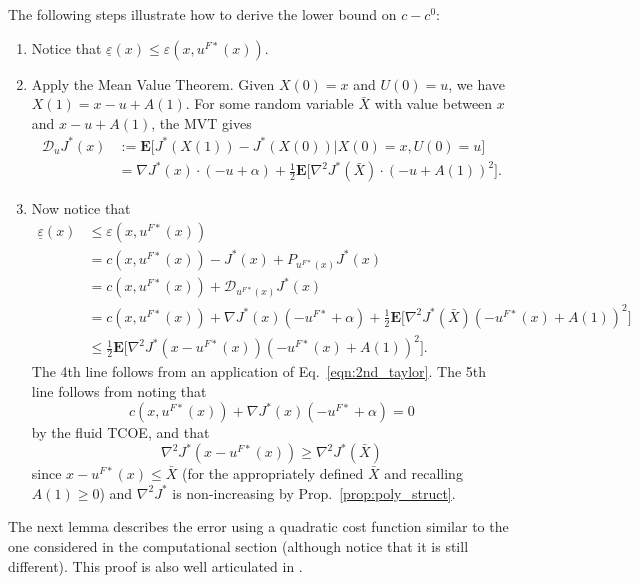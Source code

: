 \documentclass[11pt]{article}
\begin{document}
The following steps illustrate how to derive the lower bound on $c-c^0$:
\begin{enumerate}
\item Notice that $\underline \varepsilon(x) \leq \varepsilon(x,u^{F*}(x))$.
\item Apply the Mean Value Theorem. Given $X(0)=x$ and $U(0)=u$, we have $X(1)=x-u+A(1)$. For some random variable $\bar X$ with value between $x$ and $x-u+A(1)$, the MVT gives
\begin{equation}\label{eqn:2nd_taylor}
\begin{aligned}
\mathcal{D}_u J^*(x) &:= \mathbf{E} \Big[ J^*(X(1)) - J^*(X(0)) \vert X(0)=x, U(0)=u\Big] \\
	&= \nabla J^*(x) \cdot (-u + \alpha) + \frac{1}{2} \mathbf{E}\Big[ \nabla^2 J^*(\bar X) \cdot (-u + A(1))^2\Big].
\end{aligned}
\end{equation}

\item Now notice that
$$\begin{aligned}
\underline \varepsilon(x) &\leq \varepsilon(x, u^{F*}(x)) \\
	&= c\left(x,u^{F*}(x)\right) - J^*(x) + P_{u^{F*}(x)} J^*(x) \\
	&= c\left(x,u^{F*}(x)\right) + \mathcal{D}_{u^{F*}(x)}J^*(x) \\
	&= c\left(x,u^{F*}(x)\right) + \nabla J^*(x) \left(-u^{F*} +\alpha\right) + \frac{1}{2} \mathbf{E}\Big[ \nabla^2 J^*(\bar X)\left(-u^{F*}(x) + A(1)\right)^2\Big] \\
	&\leq \frac{1}{2} \mathbf{E}\Big[ \nabla^2 J^*\left(x-u^{F*}(x)\right)\left(-u^{F*}(x) + A(1)\right)^2\Big].
\end{aligned}$$
The 4th line follows from an application of Eq.~\ref{eqn:2nd_taylor}. The 5th line follows from noting that
$$c\left(x,u^{F*}(x)\right) + \nabla J^*(x) \left(-u^{F*} +\alpha\right) = 0$$
by the fluid TCOE, and that
$$\nabla^2 J^*\left(x-u^{F*}(x)\right) \geq \nabla^2 J^*(\bar X)$$
since $x - u^{F*}(x) \leq \bar X$ (for the appropriately defined $\bar X$ and recalling $A(1) \geq 0$) and $\nabla^2 J^*$ is non-increasing by Prop.~\ref{prop:poly_struct}.
\end{enumerate}

The next lemma describes the error using a quadratic cost function similar to the one considered in the computational section (although notice that it is still different). This proof is also well articulated in \cite{paper}.
\end{document}

